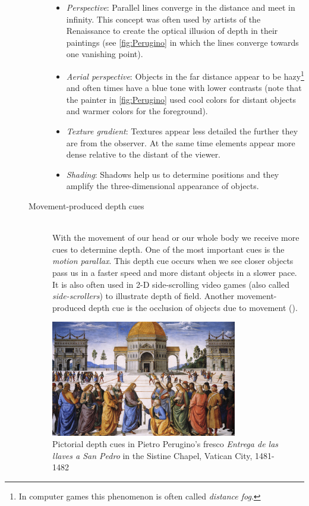 \begin{description}
\begin{description}
\begin{itemize}
		\item \textit{Perspective}: Parallel lines converge in the distance and meet in infinity. This concept was often used by artists of the Renaissance to create the optical illusion of depth in their paintings (see \autoref{fig:Perugino} in which the lines converge towards one vanishing point).
		\item \textit{Aerial perspective}: Objects in the far distance appear to be hazy\footnote{In computer games this phenomenon is often called \textit{distance fog}.} and often times have a blue tone with lower contrasts (note that the painter in \autoref{fig:Perugino} used cool colors for distant objects and warmer colors for the foreground).
		\item \textit{Texture gradient}: Textures appear less detailed the further they are from the observer. At the same time elements appear more dense relative to the distant of the viewer.  
		\item \textit{Shading}: Shadows help us to determine positions and they amplify the three-dimensional appearance of objects. 
		\end{itemize}
	\item [Movement-produced depth cues]\hfill \\ With the movement of our head or our whole body we receive more cues to determine depth. One of the most important cues is the \textit{motion parallax}. This depth cue occurs when we see closer objects pass us in a faster speed and more distant objects in a slower pace. It is also often used in 2-D side-scrolling video games (also called \textit{side-scrollers}) to illustrate depth of field.
Another movement-produced depth cue is the occlusion of objects due to movement (\cite[p.231 et seq.]{Goldstein.2015}).
\end{description}

\begin{figure}[htbp]
		\centering
		\includegraphics[width=0.8\textwidth]{figures/Perugino-San_Pedro}
		\caption[Pictorial depth cues in Pietro Perugino's fresco \textit{Entrega de las llaves a San Pedro}]{Pictorial depth cues in Pietro Perugino's fresco \textit{Entrega de las llaves a San Pedro} in the Sistine Chapel, Vatican City, 1481-1482}
		\label{fig:Perugino}
\end{figure}


\end{description}
